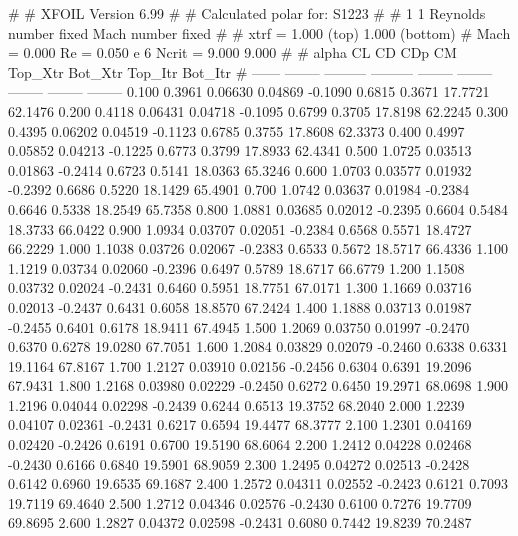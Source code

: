 #  
#       XFOIL         Version 6.99
#  
# Calculated polar for: S1223                                           
#  
# 1 1 Reynolds number fixed          Mach number fixed         
#  
# xtrf =   1.000 (top)        1.000 (bottom)  
# Mach =   0.000     Re =     0.050 e 6     Ncrit =   9.000  9.000
#  
#   alpha    CL        CD       CDp       CM     Top_Xtr  Bot_Xtr  Top_Itr  Bot_Itr
#  ------ -------- --------- --------- -------- -------- -------- -------- --------
   0.100   0.3961   0.06630   0.04869  -0.1090   0.6815   0.3671  17.7721  62.1476
   0.200   0.4118   0.06431   0.04718  -0.1095   0.6799   0.3705  17.8198  62.2245
   0.300   0.4395   0.06202   0.04519  -0.1123   0.6785   0.3755  17.8608  62.3373
   0.400   0.4997   0.05852   0.04213  -0.1225   0.6773   0.3799  17.8933  62.4341
   0.500   1.0725   0.03513   0.01863  -0.2414   0.6723   0.5141  18.0363  65.3246
   0.600   1.0703   0.03577   0.01932  -0.2392   0.6686   0.5220  18.1429  65.4901
   0.700   1.0742   0.03637   0.01984  -0.2384   0.6646   0.5338  18.2549  65.7358
   0.800   1.0881   0.03685   0.02012  -0.2395   0.6604   0.5484  18.3733  66.0422
   0.900   1.0934   0.03707   0.02051  -0.2384   0.6568   0.5571  18.4727  66.2229
   1.000   1.1038   0.03726   0.02067  -0.2383   0.6533   0.5672  18.5717  66.4336
   1.100   1.1219   0.03734   0.02060  -0.2396   0.6497   0.5789  18.6717  66.6779
   1.200   1.1508   0.03732   0.02024  -0.2431   0.6460   0.5951  18.7751  67.0171
   1.300   1.1669   0.03716   0.02013  -0.2437   0.6431   0.6058  18.8570  67.2424
   1.400   1.1888   0.03713   0.01987  -0.2455   0.6401   0.6178  18.9411  67.4945
   1.500   1.2069   0.03750   0.01997  -0.2470   0.6370   0.6278  19.0280  67.7051
   1.600   1.2084   0.03829   0.02079  -0.2460   0.6338   0.6331  19.1164  67.8167
   1.700   1.2127   0.03910   0.02156  -0.2456   0.6304   0.6391  19.2096  67.9431
   1.800   1.2168   0.03980   0.02229  -0.2450   0.6272   0.6450  19.2971  68.0698
   1.900   1.2196   0.04044   0.02298  -0.2439   0.6244   0.6513  19.3752  68.2040
   2.000   1.2239   0.04107   0.02361  -0.2431   0.6217   0.6594  19.4477  68.3777
   2.100   1.2301   0.04169   0.02420  -0.2426   0.6191   0.6700  19.5190  68.6064
   2.200   1.2412   0.04228   0.02468  -0.2430   0.6166   0.6840  19.5901  68.9059
   2.300   1.2495   0.04272   0.02513  -0.2428   0.6142   0.6960  19.6535  69.1687
   2.400   1.2572   0.04311   0.02552  -0.2423   0.6121   0.7093  19.7119  69.4640
   2.500   1.2712   0.04346   0.02576  -0.2430   0.6100   0.7276  19.7709  69.8695
   2.600   1.2827   0.04372   0.02598  -0.2431   0.6080   0.7442  19.8239  70.2487
